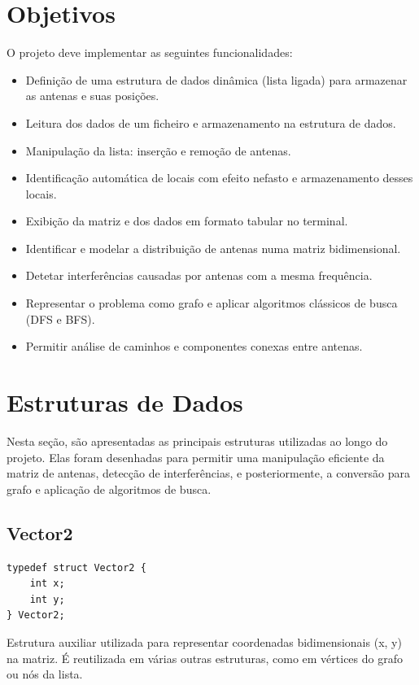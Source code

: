 \documentclass[a4paper,12pt]{article}
\begin{document}
\section{Objetivos}
O projeto deve implementar as seguintes funcionalidades:
\begin{itemize}
    \item Definição de uma estrutura de dados dinâmica (lista ligada) para armazenar as antenas e suas posições.
    \item Leitura dos dados de um ficheiro e armazenamento na estrutura de dados.
    \item Manipulação da lista: inserção e remoção de antenas.
    \item Identificação automática de locais com efeito nefasto e armazenamento desses locais.
    \item Exibição da matriz e dos dados em formato tabular no terminal.
    \item Identificar e modelar a distribuição de antenas numa matriz bidimensional.
    \item Detetar interferências causadas por antenas com a mesma frequência.
    \item Representar o problema como grafo e aplicar algoritmos clássicos de busca (DFS e BFS).
    \item Permitir análise de caminhos e componentes conexas entre antenas.
\end{itemize}

\newpage

\section{Estruturas de Dados}
Nesta seção, são apresentadas as principais estruturas utilizadas ao longo do projeto. Elas foram desenhadas para permitir uma manipulação eficiente da matriz de antenas, detecção de interferências, e posteriormente, a conversão para grafo e aplicação de algoritmos de busca.

\subsection{Vector2}
\begin{lstlisting}[style=CStyle]
typedef struct Vector2 {
    int x;
    int y;
} Vector2;
\end{lstlisting}
Estrutura auxiliar utilizada para representar coordenadas bidimensionais (x, y) na matriz. É reutilizada em várias outras estruturas, como em vértices do grafo ou nós da lista.
\end{document}
